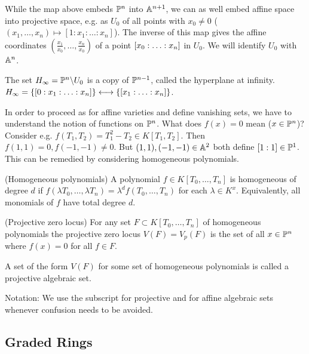 \documentclass[a4paper,11pt]{article}
\begin{document}
			\begin{remark}
				While the map above embeds $\P^n$ into $\AA^{n+1}$, we can as well embed affine space into projective space, e.g. as $U_0$ of all points with $x_0\neq0$ ($(x_1,\dots,x_n)\mapsto[1:x_1:\ldots:x_n]$). The inverse of this map gives the affine coordinates $(\frac{x_1}{x_0},\dots,\frac{x_n}{x_0})$ of a point $\x{n}$ in $U_0$. We will identify $U_0$ with $\AA^n$.
			\end{remark}

			\begin{remark}
				The set $H_\infty=\P^n\backslash U_0$ is a copy of $\P^{n-1}$, called the hyperplane at infinity. $H_\infty=\{[0:x_1:\ldots:x_n]\}\longleftrightarrow\{\x[1]{n}\}$.
			\end{remark}

			In order to proceed as for affine varieties and define vanishing sets, we have to understand the notion of functions on $\P^n$. What does $f(x)=0$ mean ($x\in\P^n$)? Consider e.g. $f(T_1,T_2)=T_1^2-T_2\in K[T_1,T_2]$. Then $f(1,1)=0,f(-1,-1)\neq0$. But $(1,1),(-1,-1)\in\AA^2$ both define $[1:1]\in\P^1$. This can be remedied by considering homogeneous polynomials.

			\begin{defi}(Homogeneous polynomials)
				A polynomial $f\in K[T_0,\dots,T_n]$ is homogeneous of degree $d$ if $f(\lambda T_0,\dots,\lambda T_n)=\lambda^d f(T_0,\dots,T_n)$ for each $\lambda\in K^x$. Equivalently, all monomials of $f$ have total degree $d$.
			\end{defi}

			\begin{defi}(Projective zero locus)
				For any set $F\subset K[T_0,\dots,T_n]$ of homogeneous polynomials the projective zero locus $V(F)=V_p(F)$ is the set of all $x\in\P^n$ where $f(x)=0$ for all $f\in F$.
			\end{defi}

			\begin{defi}
				A set of the form $V(F)$ for some set of homogeneous polynomials is called a projective algebraic set.
			\end{defi}

			\noindent Notation: We use the subscript  for projective and  for affine algebraic sets whenever confusion needs to be avoided.
		
		
		\subsection{Graded Rings}
		
\end{document}
